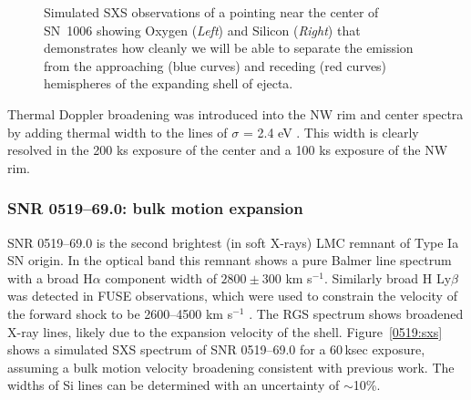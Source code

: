 \documentclass[11pt,a4paper]{article}
\begin{document}
{\begin{figure}
\hfill
{}
\hfill
{}
\hfill
\caption{Simulated SXS observations of a pointing near the center of
  SN~1006 showing Oxygen ({\it Left}) and Silicon ({\it Right}) that
  demonstrates how cleanly we will be able to separate the emission
  from the approaching (blue curves) and receding (red curves)
  hemispheres of the expanding shell of ejecta.}
 \label{sn1006:center}
\end{figure}


Thermal Doppler broadening was introduced into the NW rim and center
spectra by adding thermal width to the lines of $\sigma$ = 2.4 eV
\citep{vink03}.  This width is clearly resolved in the 200 ks exposure
of the center and a 100 ks exposure of the NW rim.

\subsubsection{SNR 0519--69.0: bulk motion expansion} \label{subsec:0519}


SNR 0519--69.0 is the second brightest (in soft X-rays) LMC remnant of
Type Ia SN origin.  In the optical band this remnant shows a pure
Balmer line spectrum \citep{tuohy+82} with a broad H$\alpha$ component
width of $2800 \pm 300$ km s$^{-1}$. Similarly broad H Ly$\beta$ was
detected in FUSE observations, which were used to constrain the
velocity of the forward shock to be 2600--4500 km s$^{-1}$
\citep{ghavamian+07}.  The RGS spectrum \citep{rasmussen02} shows
broadened X-ray lines, likely due to the expansion velocity of the
shell.  Figure~\ref{0519:sxs} shows a simulated SXS spectrum of SNR
0519--69.0 for a 60\,ksec exposure, assuming a bulk motion velocity
broadening consistent with previous work.  The widths of Si lines can
be determined with an uncertainty of $\sim$10\%.

}
\end{document}
